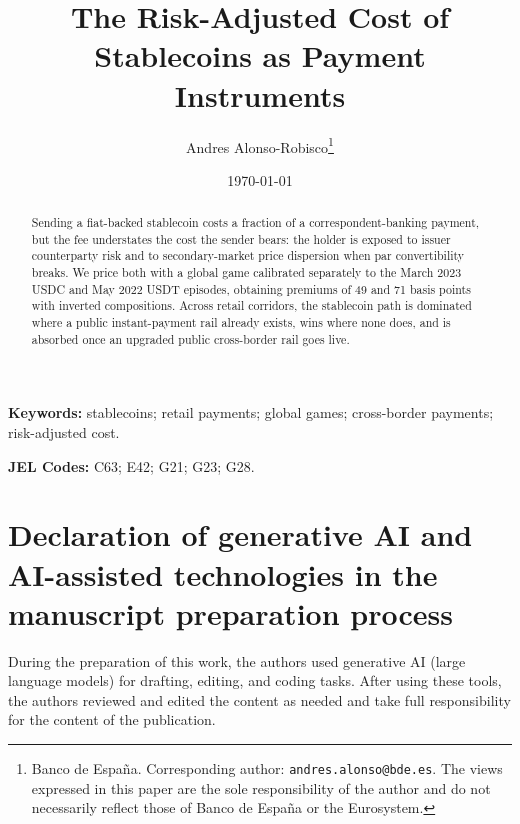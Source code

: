 \documentclass[12pt]{article}
\title{The Risk-Adjusted Cost of Stablecoins as Payment Instruments}
\author{
Andres Alonso-Robisco\thanks{Banco de Espa\~na.
Corresponding author: \texttt{andres.alonso@bde.es}.
The views expressed in this paper are the sole responsibility of the
author and do not necessarily reflect those of Banco de Espa\~na or
the Eurosystem.}
}
\date{\today}
\begin{document}
\maketitle
\doublespacing

\vspace{0.5em}
\begin{abstract}
\noindent Sending a fiat-backed stablecoin costs a fraction of a correspondent-banking payment, but the fee understates the cost the sender bears: the holder is exposed to issuer counterparty risk and to secondary-market price dispersion when par convertibility breaks. We price both with a global game calibrated separately to the March 2023 USDC and May 2022 USDT episodes, obtaining premiums of 49 and 71 basis points with inverted compositions. Across retail corridors, the stablecoin path is dominated where a public instant-payment rail already exists, wins where none does, and is absorbed once an upgraded public cross-border rail goes live.
\end{abstract}

\vspace{2em}

\noindent\textbf{Keywords:} stablecoins; retail payments; global games; cross-border payments; risk-adjusted cost.

\medskip
\noindent\textbf{JEL Codes:} C63; E42; G21; G23; G28.

\clearpage











\clearpage
\section*{Declaration of generative AI and AI-assisted technologies in the manuscript preparation process}

During the preparation of this work, the authors used generative AI (large language models) for drafting, editing, and coding tasks. After using these tools, the authors reviewed and edited the content as needed and take full responsibility for the content of the publication.

\clearpage
\begingroup
\singlespacing


\endgroup

\clearpage
\appendix




\end{document}
